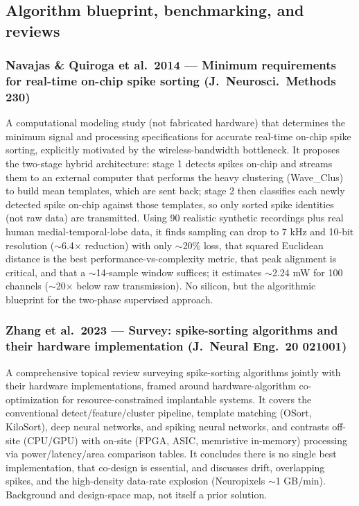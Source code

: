 \documentclass[11pt]{article}
\begin{document}
\subsection*{Algorithm blueprint, benchmarking, and reviews}

\subsubsection*{Navajas \& Quiroga et al.\ 2014 --- Minimum requirements for real-time on-chip spike sorting (J.\ Neurosci.\ Methods 230)}
A computational modeling study (not fabricated hardware) that determines the minimum signal and processing specifications for accurate real-time on-chip spike sorting, explicitly motivated by the wireless-bandwidth bottleneck. It proposes the two-stage hybrid architecture: stage 1 detects spikes on-chip and streams them to an external computer that performs the heavy clustering (Wave\_Clus) to build mean templates, which are sent back; stage 2 then classifies each newly detected spike on-chip against those templates, so only sorted spike identities (not raw data) are transmitted. Using 90 realistic synthetic recordings plus real human medial-temporal-lobe data, it finds sampling can drop to 7 kHz and 10-bit resolution ($\sim$6.4$\times$ reduction) with only $\sim$20\% loss, that squared Euclidean distance is the best performance-vs-complexity metric, that peak alignment is critical, and that a $\sim$14-sample window suffices; it estimates $\sim$2.24 mW for 100 channels ($\sim$20$\times$ below raw transmission). No silicon, but the algorithmic blueprint for the two-phase supervised approach.

\subsubsection*{Zhang et al.\ 2023 --- Survey: spike-sorting algorithms and their hardware implementation (J.\ Neural Eng.\ 20 021001)}
A comprehensive topical review surveying spike-sorting algorithms jointly with their hardware implementations, framed around hardware-algorithm co-optimization for resource-constrained implantable systems. It covers the conventional detect/feature/cluster pipeline, template matching (OSort, KiloSort), deep neural networks, and spiking neural networks, and contrasts off-site (CPU/GPU) with on-site (FPGA, ASIC, memristive in-memory) processing via power/latency/area comparison tables. It concludes there is no single best implementation, that co-design is essential, and discusses drift, overlapping spikes, and the high-density data-rate explosion (Neuropixels $\sim$1 GB/min). Background and design-space map, not itself a prior solution.
\end{document}
